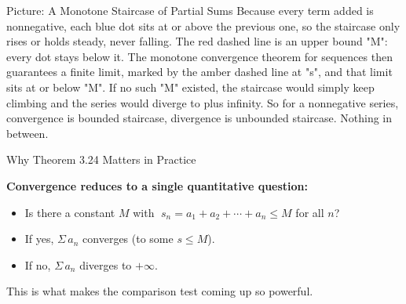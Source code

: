 \documentclass[aspectratio=169,12pt,t]{beamer}
\begin{document}
{\begin{frame}{Picture: A Monotone Staircase of Partial Sums}
{    Because every term added is nonnegative, each blue dot sits at
    or above the previous one, so the staircase only rises or holds
    steady, never falling. The red dashed line is an upper bound
    "M": every dot stays below it. The monotone convergence theorem
    for sequences then guarantees a finite limit, marked by the
    amber dashed line at "s", and that limit sits at or below "M".
    If no such "M" existed, the staircase would simply keep
    climbing and the series would diverge to plus infinity. So for
    a nonnegative series, convergence is bounded staircase,
    divergence is unbounded staircase. Nothing in between.
  }
\end{frame}

\begin{frame}{Why Theorem 3.24 Matters in Practice}
  \begin{hlbox}
    \textbf{Convergence reduces to a single quantitative question:}
    \begin{itemize}
      \item Is there a constant $M$ with
        $\;s_n = a_1 + a_2 + \cdots + a_n \leq M$ for all $n$?
      \item If yes, $\Sigma\, a_n$ converges (to some $s \leq M$).
      \item If no, $\Sigma\, a_n$ diverges to $+\infty$.
    \end{itemize}
  \end{hlbox}

  \vspace{0.4em}
  \begin{hlbox}
    This is what makes the \alert{comparison test} coming up so
    powerful.
  \end{hlbox}

\end{frame}
}
\end{document}

